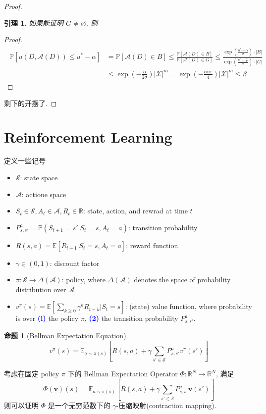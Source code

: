 \documentclass[8pt]{article}
\theoremstyle{compact}
\newtheorem{lemma}[theorem]{引理}
\newtheorem{proposition}[theorem]{命题}
\def\num#1{\textnormal{\textbf{\mbox{\textcolor{blue}{(#1)}}}}}
\def\le{\leqslant}
\def\ge{\geqslant}
\def\P#1{\mathbb{P}\left[{#1}\right]}
\begin{document}
\begin{proof}
	\begin{lemma}
		如果能证明 $G \neq \varnothing$, 则
	\end{lemma}
	\begin{proof}
		\begin{align*}
			\begin{split}
				\P{u(D, \mathcal A(D)) \le u^* - \alpha} &= \P{\mathcal A(D) \in B} \le \frac{\P{\mathcal A(D) \in B}}{\P{\mathcal A(D) \in G}} \le \frac{\exp\left(\frac{u^* - \alpha}{\sigma}\right)\cdot |B|}{\exp\left(\frac{u^* - \frac{\alpha}{2}}{\sigma}\right)\cdot |G|} \\&\le \exp\left(-\frac{\alpha}{2\sigma}\right)|\mathcal X|^m = \exp\left(-\frac{\alpha n \varepsilon}{4}\right)|\mathcal X|^m \le \beta
			\end{split}
		\end{align*}
	\end{proof}
	
	剩下的开摆了.
\end{proof}

\newpage
\section{Reinforcement Learning}
定义一些记号
\begin{itemize}
	\item $\mathcal S$: state space
    \item $\mathcal A$: actione space
    \item $S_t \in \mathcal S, A_t \in \mathcal A, R_t \in \mathbb R$: state, action, and rewrad at time $t$
    \item $P_{s, s'}^{a} = \mathbb P(S_{t+1} = s' | S_t = s, A_t = a)$: transition probability
    \item $R(s, a) = \mathbb E[R_{t+1} | S_t = s, A_t = a]$: reward function
    \item $\gamma \in (0, 1)$: discount factor
    \item $\pi: \mathcal S \to \Delta(\mathcal A)$: policy, where $\Delta(\mathcal A)$ denotes the space of probability distribution over $\mathcal A$
    \item $v^{\pi}(s) = \mathbb E\left[\sum\limits_{k \ge 0}\gamma^kR_{t+k} \bigg| S_t = s\right]$: (state) value function, where probability is over \num{i} the policy $\pi$, \num{2} the transition probability $P_{s, s'}^a$.
\end{itemize}
\begin{proposition}[Bellman Expectation Equation]
	$$v^{\pi}(s) = \mathbb E_{a \sim \pi(s)}\left[R(s, a) + \gamma\sum_{s' \in \mathcal S}P_{s, s'}^av^{\pi}(s')\right]$$
\end{proposition}
考虑在固定 policy $\pi$ 下的 Bellman Expectation Operator $\Phi: \mathbb R^{N} \to \mathbb R^{N}$, 满足 $$\Phi(\mathbf v)(s) = \mathbb E_{a \sim \pi(s)}\left[R(s, a) + \gamma\sum_{s' \in \mathcal S}P_{s, s'}^a\mathbf v(s')\right]$$
则可以证明 $\Phi$ 是一个无穷范数下的 $\gamma$-压缩映射(contraction mapping).
\end{document}
